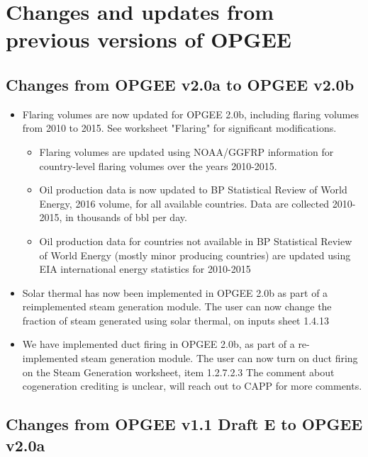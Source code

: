 \documentclass[11pt]{report}
\begin{document}

\chapter{Changes and updates from previous versions of OPGEE}




\section{Changes from OPGEE v2.0a to OPGEE v2.0b}

\begin{itemize}
\item Flaring volumes are now updated for OPGEE 2.0b, including flaring volumes from 2010 to 2015. See worksheet "Flaring" for significant modifications.
	\begin{itemize}
	\item Flaring volumes are updated using NOAA/GGFRP information for country-level flaring volumes over the years 2010-2015.
	\item Oil production data is now updated to BP Statistical Review of World Energy, 2016 volume, for all available countries. Data are collected 2010-2015, in thousands of bbl per day.
	\item Oil production data for countries not available in BP Statistical Review of World Energy (mostly minor producing countries) are updated using EIA international energy statistics for 2010-2015
	\end{itemize}
\item Solar thermal has now been implemented in OPGEE 2.0b as part of a reimplemented steam generation module. The user can now change the fraction of steam generated using solar thermal, on inputs sheet 1.4.13

\item We have implemented duct firing in OPGEE 2.0b, as part of a re-implemented steam generation module. The user can now turn on duct firing on the Steam Generation worksheet, item 1.2.7.2.3
The comment about cogeneration crediting is unclear, will reach out to CAPP for more comments.
\end{itemize}




\section{Changes from OPGEE v1.1 Draft E to OPGEE v2.0a}
\end{document}

